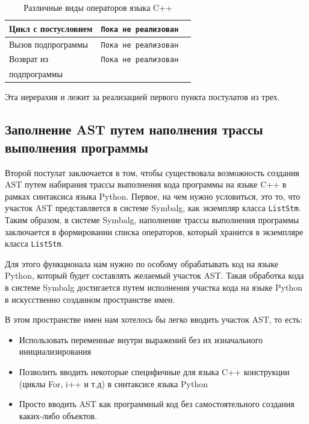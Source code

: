 \begin{table}
\begin{center}
\begin{tabular}{|l|l|l|}
            \hline
            Цикл с постусловием & \verb"Пока не реализован" &\\
            \hline
            Вызов подпрограммы & \verb"Пока не реализован"  &\\
            \hline
            Возврат из   & \verb"Пока не реализован"        &\\
            подпрограммы &                                  &\\
            \hline
        \end{tabular}
    \end{center}
    \caption{Различные виды операторов языка {\sf C++}}
    \label{tab:clstms}
\end{table}

Эта иерерахия и лежит за реализацией первого пункта постулатов из трех.

\subsection{Заполнение AST путем наполнения трассы выполнения программы}
Второй постулат заключается в том, чтобы существовала возможность создания AST путем набирания трассы выполнения кода программы на языке {\sf C++} в рамках синтаксиса языка {\sf Python}. 
Первое, на чем нужно условиться, это то, что участок AST представляется в системе {\sf Symbalg}, как экземпляр класса \verb"ListStm".
Таким образом, в системе {\sf Symbalg}, наполнение трассы выполнения программы заключается в формировании списка операторов, который хранится в экземпляре класса \verb"ListStm".

Для этого функционала нам нужно по особому обрабатывать код на языке {\sf Python}, который будет составлять желаемый участок AST. 
Такая обработка кода в системе {\sf Symbalg} достигается путем исполнения участка кода на языке {\sf Python} в искусственно созданном пространстве имен. 

В этом пространстве имен нам хотелось бы легко вводить участок AST, то есть:
\begin{itemize}
    \item Использовать переменные внутри выражений без их изначального инициализирования
    \item Позволить вводить некоторые специфичные для языка {\sf C++} конструкции (циклы For, i++ и т.д) в синтаксисе языка {\sf Python}
    \item Просто вводить AST как программный код без самостоятельного создания каких-либо объектов.
\end{itemize}

